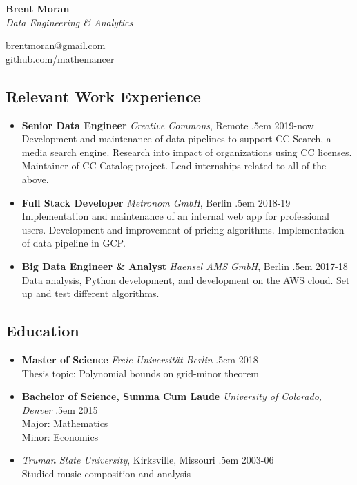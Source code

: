 \documentclass[a4paper]{article}
\makeatletter
\newcommand \brentfill {
  \tiny
  \leavevmode \cleaders 
  \hb@xt@ .5em{\hss \textperiodcentered \hss }\hfill \kern \z@
  \normalsize
}
\newcommand{\bbull}{\ding{118}}
\makeatother
\begin{document}
\noindent
\begin{minipage}[b][1cm]{.7\textwidth}
  \Huge\textbf{Brent Moran} \\
  \normalsize\emph{Data Engineering \& Analytics}
\end{minipage}
\begin{minipage}[b][1cm]{.4\textwidth}
  \raggedleft
  \ttfamily
  \href{mailto:brentmoran@gmail.com}{brentmoran@gmail.com} \\
  \href{https://github.com/mathemancer}{github.com/mathemancer}
\end{minipage}

\subsection*{Relevant Work Experience \hrulefill}

\begin{itemize}
  \item[\bbull] \textbf{Senior Data Engineer} \emph{Creative Commons},
    Remote \brentfill{} 2019-now\\
    Development and maintenance of data pipelines to support CC Search, a media
    search engine.  Research into impact of organizations using CC licenses.
    Maintainer of CC Catalog project.  Lead internships related to all of the
    above.
  \item[\bbull] \textbf{Full Stack Developer} \emph{Metronom GmbH},
    Berlin \brentfill{} 2018-19\\
    Implementation and maintenance of an internal web app for professional
    users. Development and improvement of pricing algorithms. Implementation of
    data pipeline in GCP.
  \item[\bbull] \textbf{Big Data Engineer \& Analyst} \emph{Haensel AMS
    GmbH}, Berlin \brentfill{} 2017-18\\
    Data analysis, Python development, and development on the AWS cloud.
    Set up and test different algorithms.
\end{itemize}

\subsection*{Education \hrulefill}
\begin{itemize}
  \item[\bbull] \textbf{Master of Science} \emph{Freie
    Universit\"at Berlin} \brentfill{} 2018\\
    Thesis topic:  Polynomial bounds on grid-minor theorem
  \item[\bbull] \textbf{Bachelor of Science, Summa Cum Laude} \emph{University
      of Colorado, Denver} \brentfill{} 2015\\
    Major:  Mathematics \\
    Minor: Economics
  \item[\bbull] \emph{Truman State University}, Kirksville,
    Missouri \brentfill{} 2003-06\\
    Studied music composition and analysis
\end{itemize}
\end{document}

